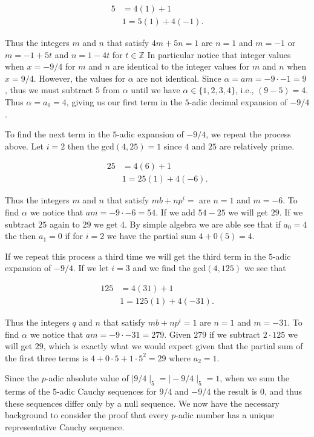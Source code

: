 \documentclass[12pt]{amsart}
\theoremstyle{plain}
\theoremstyle{definition}
\begin{document}
\begin{align}
5 & = 4(1) + 1\nonumber \\
&1 = 5(1) + 4(-1).\nonumber
\end{align}

Thus the integers $m$ and $n$ that satisfy $4m + 5n = 1 $ are $n = 1$ and $m = -1$ or $m = -1 + 5t$ and $n = 1-4t$ for $ t \in \mathbb{Z}$ In particular notice that integer values when $x = -9/4$ for $m$ and $n$ are identical to the integer values for $m$ and $n$ when $x = 9/4$. However, the values for $\alpha$ are not identical.   Since $\alpha = am = -9 \cdot -1 = 9$ , thus  we  must subtract $5$ from  $\alpha$ until we have $\alpha \in \{1, 2, 3, 4 \}$, i.e., $(9-5)  = 4$.   Thus $\alpha = a_0 = 4$, giving us our first term in the $5$-adic decimal expansion of $-9/4$.

To find the next term in the $5$-adic expansion of $-9/4$, we repeat the process above. Let $i = 2$ then the gcd$(4, 25) = 1$ since $4$ and $25$ are relatively  prime.

\begin{align}
25 & = 4(6) + 1 \nonumber \\
&1 = 25(1) + 4(-6).\nonumber
\end{align}

Thus the integers $m$ and $n$ that satisfy $mb + np^i = $ are $n = 1$ and $m = -6$. To find $\alpha$ we notice that $am = -9 \cdot -6 = 54$. If we add $54 - 25$ we will get $29$. If we subtract $25$ again to $29$ we get $4$. By simple algebra we are able see that if $a_0 = 4$ the then $a_1 = 0$ if for $i = 2$ we have the partial sum $4 + 0(5) = 4$.

If we repeat this process a third time we will get the third term in the $5$-adic expansion of $-9/4$. If we let $i = 3$ and we find the gcd$(4, 125)$ we see that 

\begin{align}
125 & = 4(31) + 1  \nonumber\\
&1 = 125(1) + 4(-31).\nonumber
\end{align}

Thus the integers $q$ and $n$ that satisfy $mb + np^i = 1 $ are $n = 1$ and $m = -31$. To find $\alpha$ we notice that $am = -9 \cdot -31 = 279$. Given $279$ if we subtract  $2 \cdot 125$ we will get $29$, which is exactly  what we would expect given that the partial sum of the first three terms is $4 + 0 \cdot 5  + 1 \cdot 5^2 = 29$  where $a_2 = 1$.

 Since the $p$-adic absolute value of $\mid 9/4 \mid_5 = \mid -9/4 \mid_5 = 1$, when we sum the terms of the $5$-adic Cauchy sequences for $9/4$ and $-9/4$ the result is $0$, and thus these sequences differ only by a null sequence. We now have the  necessary background to consider the proof  that every $p$-adic number has a unique representative Cauchy sequence. 
\end{document}
